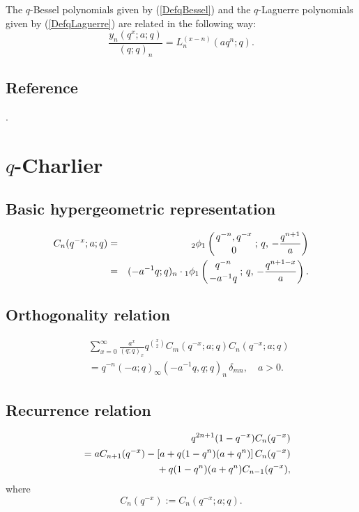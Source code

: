 \documentclass[envcountchap,graybox]{svmono}
\newcommand{\qhyp}[5]{\mbox{}_{#1}{\phi}_{#2}
\left(\genfrac{}{}{0pt}{}{#3}{#4}\,;\,q,\,#5\right)}
\newcommand{\mathindent}{\hspace{7.5mm}}
\begin{document}
\noindent
The $q$-Bessel polynomials given by (\ref{DefqBessel}) and the $q$-Laguerre
polynomials given by (\ref{DefqLaguerre}) are related in the following way:
$$\frac{y_n(q^x;a;q)}{(q;q)_n}=L_n^{(x-n)}(aq^n;q).$$

\subsection*{Reference}
\cite{DattaGriffin}.


\section{$q$-Charlier}
\par\setcounter{equation}{0}

\subsection*{Basic hypergeometric representation}
\begin{eqnarray}
\label{DefqCharlier}
C_n(q^{-x};a;q)&=&\qhyp{2}{1}{q^{-n},q^{-x}}{0}{-\frac{q^{n+1}}{a}}\\
&=&(-a^{-1}q;q)_n\cdot\qhyp{1}{1}{q^{-n}}{-a^{-1}q}{-\frac{q^{n+1-x}}{a}}.\nonumber
\end{eqnarray}

\subsection*{Orthogonality relation}
\begin{eqnarray}
\label{OrtqCharlier}
& &\sum_{x=0}^{\infty}\frac{a^x}{(q;q)_x}q^{\binom{x}{2}}C_m(q^{-x};a;q)C_n(q^{-x};a;q)\nonumber\\
& &{}=q^{-n}(-a;q)_{\infty}(-a^{-1}q,q;q)_n\,\delta_{mn},\quad a>0.
\end{eqnarray}

\newpage

\subsection*{Recurrence relation}
\begin{eqnarray}
\label{RecqCharlier}
& &q^{2n+1}(1-q^{-x})C_n(q^{-x})\nonumber\\
& &{}=aC_{n+1}(q^{-x})-\left[a+q(1-q^n)(a+q^n)\right]C_n(q^{-x})\nonumber\\
& &{}\mathindent{}+q(1-q^n)(a+q^n)C_{n-1}(q^{-x}),
\end{eqnarray}
where
$$C_n(q^{-x}):=C_n(q^{-x};a;q).$$
\end{document}
